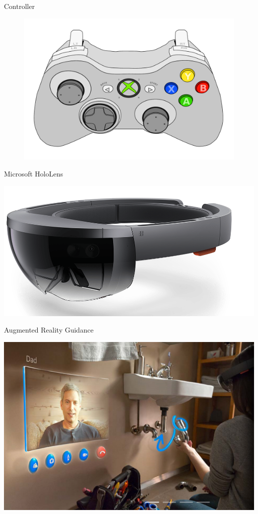\documentclass[10pt]{beamer}
\begin{document}
\begin{frame}[fragile]{Controller}
  \begin{figure}[h!]
    \begin{center}
      \includegraphics[width=0.75\linewidth]{../img/Xbox_Controller.pdf}
    \end{center}
  \end{figure}
\end{frame}

\begin{frame}[fragile]{Microsoft HoloLens}
  \begin{center}
    \includegraphics[width=\textwidth]{../img/Hololens.png}
  \end{center}
\end{frame}

\begin{frame}[fragile]{Augmented Reality Guidance}
  \begin{center}
    \includegraphics[width=\textwidth]{../img/sink.png}
  \end{center}
\end{frame}
\end{document}
